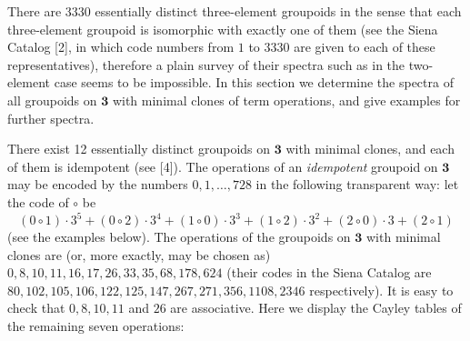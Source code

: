 \documentclass[a4paper,reqno]{amsart}\usepackage{amssymb,latexsym}
\theoremstyle{definition}
\theoremstyle{remark}
\numberwithin{equation}{section}
\numberwithin{theorem}{section}
\begin{document}
There are 3330 essentially distinct three-element groupoids in the sense that
each three-element groupoid is isomorphic with exactly one of them (see the
Siena Catalog [2], in which code numbers from $1$ to $3330$ are given to each
of these representatives), therefore a plain survey of their spectra such as
in the two-element case seems to be impossible. In this section we determine
the spectra of all groupoids on $\mathbf{3}$ with minimal clones of term
operations, and give examples for further spectra.

There exist 12 essentially distinct groupoids on $\mathbf{3}$ with minimal
clones, and each of them is idempotent (see [4]). The operations of an
\textit{idempotent} groupoid on $\mathbf{3}$ may be encoded by the numbers
$0,1,\ldots,728$ in the following transparent way: let the code of $\circ$ be\[
(0\circ1)\cdot3^{5}+(0\circ2)\cdot3^{4}+(1\circ0)\cdot3^{3}+(1\circ
2)\cdot3^{2}+(2\circ0)\cdot3+(2\circ1)
\]
(see the examples below). The operations of the groupoids on $\mathbf{3}$ with
minimal clones are (or, more exactly, may be chosen as)
$0,8,10,11,16,17,26,33,35,68,178,624$ (their codes in the Siena Catalog are
$80,102,105,106,122,125,147,267,271,356,\allowbreak1108,2346$ respectively).
It is easy to check that $0,8,10,11$ and $26$ are associative. Here we display
the Cayley tables of the remaining seven operations:
\end{document}
